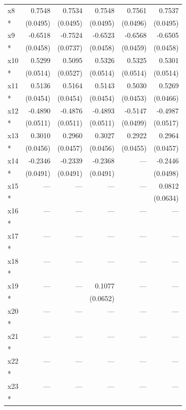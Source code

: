 \begin{longtable}{lrrrrr}
x8 & 0.7548 & 0.7534 & 0.7548 & 0.7561 & 0.7537 \\*
 & (0.0495) & (0.0495) & (0.0495) & (0.0496) & (0.0495) \\
x9 & -0.6518 & -0.7524 & -0.6523 & -0.6568 & -0.6505 \\*
 & (0.0458) & (0.0737) & (0.0458) & (0.0459) & (0.0458) \\
x10 & 0.5299 & 0.5095 & 0.5326 & 0.5325 & 0.5301 \\*
 & (0.0514) & (0.0527) & (0.0514) & (0.0514) & (0.0514) \\
x11 & 0.5136 & 0.5164 & 0.5143 & 0.5030 & 0.5269 \\*
 & (0.0454) & (0.0454) & (0.0454) & (0.0453) & (0.0466) \\
x12 & -0.4890 & -0.4876 & -0.4893 & -0.5147 & -0.4987 \\*
 & (0.0511) & (0.0511) & (0.0511) & (0.0499) & (0.0517) \\
x13 & 0.3010 & 0.2960 & 0.3027 & 0.2922 & 0.2964 \\*
 & (0.0456) & (0.0457) & (0.0456) & (0.0455) & (0.0457) \\
x14 & -0.2346 & -0.2339 & -0.2368 & --- & -0.2446 \\*
 & (0.0491) & (0.0491) & (0.0491) &  & (0.0498) \\
x15 & --- & --- & --- & --- & 0.0812 \\*
 &  &  &  &  & (0.0634) \\
x16 & --- & --- & --- & --- & --- \\*
 &  &  &  &  &  \\
x17 & --- & --- & --- & --- & --- \\*
 &  &  &  &  &  \\
x18 & --- & --- & --- & --- & --- \\*
 &  &  &  &  &  \\
x19 & --- & --- & 0.1077 & --- & --- \\*
 &  &  & (0.0652) &  &  \\
x20 & --- & --- & --- & --- & --- \\*
 &  &  &  &  &  \\
x21 & --- & --- & --- & --- & --- \\*
 &  &  &  &  &  \\
x22 & --- & --- & --- & --- & --- \\*
 &  &  &  &  &  \\
x23 & --- & --- & --- & --- & --- \\*
 &  &  &  &  &  \\

\end{longtable}
